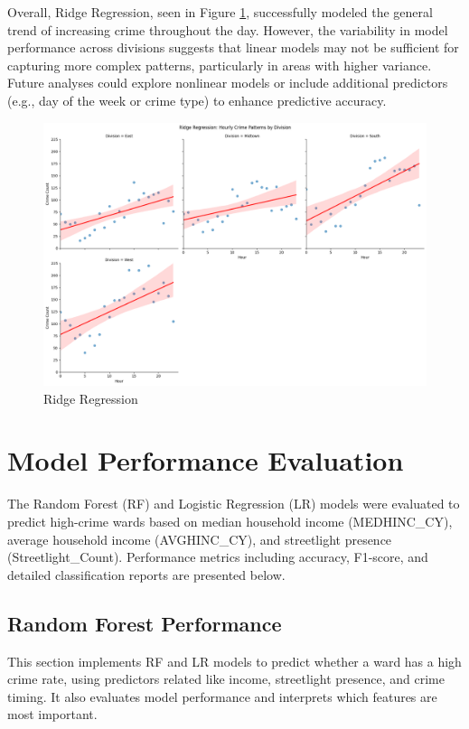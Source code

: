 \documentclass{report}
\begin{document}
Overall, Ridge Regression, seen in Figure \ref{fig:ridge-reg}, successfully modeled the general trend of increasing crime throughout the day. However, the variability in model performance across divisions suggests that linear models may not be sufficient for capturing more complex patterns, particularly in areas with higher variance. Future analyses could explore nonlinear models or include additional predictors (e.g., day of the week or crime type) to enhance predictive accuracy.

\newpage
\begin{figure}[h!]
  \begin{center}
    \advance\leftskip-3cm
    \advance\rightskip-3cm
    \includegraphics[keepaspectratio=true,scale=.5]{ridge-reg}
    \caption{Ridge Regression}
    \label{fig:ridge-reg}
  \end{center}
\end{figure}

\newpage
\section{Model Performance Evaluation}
\par The Random Forest (RF) and Logistic Regression (LR) models were evaluated to predict high-crime wards based on median household income (MEDHINC\_CY), average household income (AVGHINC\_CY), and streetlight presence (Streetlight\_Count). Performance metrics including accuracy, F1-score, and detailed classification reports are presented below.

\subsection{Random Forest Performance}
\par This section implements RF and LR models to predict whether a ward has a high crime rate, using predictors related like income, streetlight presence, and crime timing. It also evaluates model performance and interprets which features are most important.
\end{document}
